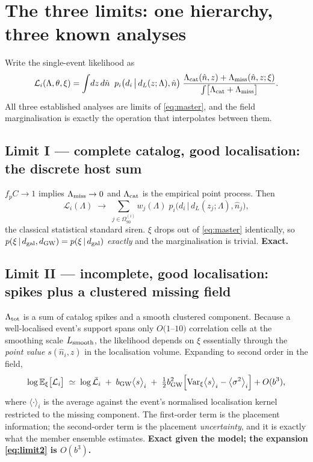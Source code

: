 \section{The three limits: one hierarchy, three known analyses}
\label{sec:limits}

Write the single-event likelihood as
\begin{equation}
  \mathcal L_i(\Lambda,\theta,\xi)
  =\int\! dz\,d\hat n\;\;p_i\big(d_i\,\big|\,d_L(z;\Lambda),\hat n\big)\;
  \frac{\Lambda_{\rm cat}(\hat n,z)+\Lambda_{\rm miss}(\hat n,z;\xi)}
       {\int\!\big[\Lambda_{\rm cat}+\Lambda_{\rm miss}\big]} .
  \label{eq:master}
\end{equation}
All three established analyses are limits of \eqref{eq:master}, and the field
marginalisation is exactly the operation that interpolates between them.

\subsection{Limit I --- complete catalog, good localisation: the discrete host sum}

$f_pC\to1$ implies $\Lambda_{\rm miss}\to0$ and $\Lambda_{\rm cat}$ is the
empirical point process.  Then
\begin{equation}
  \mathcal L_i(\Lambda)\;\longrightarrow\;
  \sum_{j\in\Omega_{90}^{(i)}} w_j(\Lambda)\;
  p_i\big(d_i\,\big|\,d_L(z_j;\Lambda),\hat n_j\big),
  \label{eq:limit1}
\end{equation}
the classical statistical standard siren.  $\xi$ drops out of
\eqref{eq:master} identically, so
$p(\xi\,|\,d_{\rm gal},d_{\rm GW})=p(\xi\,|\,d_{\rm gal})$ \emph{exactly} and
the marginalisation is trivial.  \textbf{Exact.}

\subsection{Limit II --- incomplete, good localisation: spikes plus a clustered missing field}

$\Lambda_{\rm tot}$ is a sum of catalog spikes and a smooth clustered
component.  Because a well-localised event's support spans only $O(1$--$10)$
correlation cells at the smoothing scale $L_{\rm smooth}$, the likelihood
depends on $\xi$ essentially through the \emph{point value}
$s(\hat n_i,z)$ in the localisation volume.  Expanding to second order in the
field,
\begin{equation}
  \log\mathbb E_\xi\big[\mathcal L_i\big]
  \;\simeq\;\log\bar{\mathcal L}_i
  \;+\;b_{\rm GW}\big\langle s\big\rangle_{i}
  \;+\;\tfrac12 b_{\rm GW}^2\Big[
   \mathrm{Var}_\xi\big\langle s\big\rangle_{i}
   -\big\langle\sigma^2\big\rangle_{i}\Big]+O(b^3),
  \label{eq:limit2}
\end{equation}
where $\langle\cdot\rangle_i$ is the average against the event's normalised
localisation kernel restricted to the missing component.  The first-order term
is the placement information; the second-order term is the placement
\emph{uncertainty}, and it is exactly what the member ensemble estimates.
\textbf{Exact given the model; the expansion \eqref{eq:limit2} is $O(b^3)$.}


